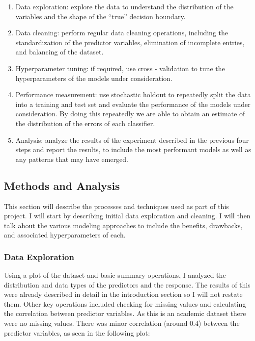 \documentclass[
]{article}
\begin{document}
\begin{enumerate}
\def\labelenumi{\arabic{enumi})}
\item
  Data exploration: explore the data to understand the distribution of
  the variables and the shape of the ``true'' decision boundary.
\item
  Data cleaning: perform regular data cleaning operations, including the
  standardization of the predictor variables, elimination of incomplete
  entries, and balancing of the dataset.
\item
  Hyperparameter tuning: if required, use cross - validation to tune the
  hyperparameters of the models under consideration.
\item
  Performance measurement: use stochastic holdout to repeatedly split
  the data into a training and test set and evaluate the performance of
  the models under consideration. By doing this repeatedly we are able
  to obtain an estimate of the distribution of the errors of each
  classifier.
\item
  Analysis: analyze the results of the experiment described in the
  previous four steps and report the results, to include the most
  performant models as well as any patterns that may have emerged.
\end{enumerate}

\hypertarget{methods-and-analysis}{%
\subsection{Methods and Analysis}\label{methods-and-analysis}}

This section will describe the processes and techniques used as part of
this project. I will start by describing initial data exploration and
cleaning. I will then talk about the various modeling approaches to
include the benefits, drawbacks, and associated hyperparameters of each.

\hypertarget{data-exploration}{%
\subsubsection{Data Exploration}\label{data-exploration}}

Using a plot of the dataset and basic summary operations, I analyzed the
distribution and data types of the predictors and the response. The
results of this were already described in detail in the introduction
section so I will not restate them. Other key operations included
checking for missing values and calculating the correlation between
predictor variables. As this is an academic dataset there were no
missing values. There was minor correlation (around 0.4) between the
predictor variables, as seen in the following plot:
\end{document}
